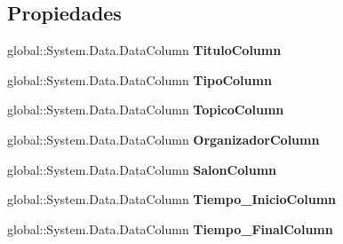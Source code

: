 \subsection*{Propiedades}
\begin{DoxyCompactItemize}
\item 
global\+::\+System.\+Data.\+Data\+Column {\bfseries Titulo\+Column}\hspace{0.3cm}{\ttfamily  [get]}\label{class_resa___pro_1_1_resa_d_b_data_set_1_1_obtener_eventos_detallados_x_i_d_data_table_a7285fecedd24088b48e0d488d679d2e7}

\item 
global\+::\+System.\+Data.\+Data\+Column {\bfseries Tipo\+Column}\hspace{0.3cm}{\ttfamily  [get]}\label{class_resa___pro_1_1_resa_d_b_data_set_1_1_obtener_eventos_detallados_x_i_d_data_table_afaa608f0d672ebfd745a91d2af743e3c}

\item 
global\+::\+System.\+Data.\+Data\+Column {\bfseries Topico\+Column}\hspace{0.3cm}{\ttfamily  [get]}\label{class_resa___pro_1_1_resa_d_b_data_set_1_1_obtener_eventos_detallados_x_i_d_data_table_a3e26de894519184bd41039760d052baf}

\item 
global\+::\+System.\+Data.\+Data\+Column {\bfseries Organizador\+Column}\hspace{0.3cm}{\ttfamily  [get]}\label{class_resa___pro_1_1_resa_d_b_data_set_1_1_obtener_eventos_detallados_x_i_d_data_table_af55603395efb58963762858cc5c27969}

\item 
global\+::\+System.\+Data.\+Data\+Column {\bfseries Salon\+Column}\hspace{0.3cm}{\ttfamily  [get]}\label{class_resa___pro_1_1_resa_d_b_data_set_1_1_obtener_eventos_detallados_x_i_d_data_table_a7f3223c5b855520144a9d6effbe39569}

\item 
global\+::\+System.\+Data.\+Data\+Column {\bfseries Tiempo\+\_\+\+Inicio\+Column}\hspace{0.3cm}{\ttfamily  [get]}\label{class_resa___pro_1_1_resa_d_b_data_set_1_1_obtener_eventos_detallados_x_i_d_data_table_a0a0130f8f5e4ddd88ca5aec5ad43fcb9}

\item 
global\+::\+System.\+Data.\+Data\+Column {\bfseries Tiempo\+\_\+\+Final\+Column}\hspace{0.3cm}{\ttfamily  [get]}\label{class_resa___pro_1_1_resa_d_b_data_set_1_1_obtener_eventos_detallados_x_i_d_data_table_a1109999a80f14b9a7a90f1880b4a8e06}


\end{DoxyCompactItemize}
